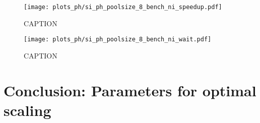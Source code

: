 \documentclass[main.tex]{subfiles}
\begin{document}
\begin{figure}[ht!]
    \centering
    \texttt{[image: plots\_ph/si\_ph\_poolsize\_8\_bench\_ni\_speedup.pdf]}
    \caption{CAPTION}
    \label{fig:scaling_ph_ni_poolsize_8_si}
\end{figure}

\begin{figure}[ht!]
    \centering
    \texttt{[image: plots\_ph/si\_ph\_poolsize\_8\_bench\_ni\_wait.pdf]}
    \caption{CAPTION}
    \label{fig:scaling_ph_ni_poolsize_8_si_wait}
\end{figure}

\section{Conclusion: Parameters for optimal scaling}
\end{document}
